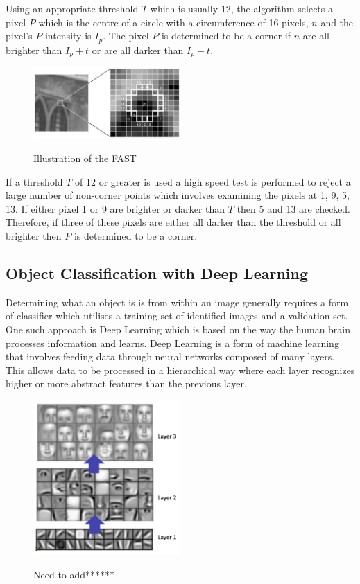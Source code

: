 \documentclass{mproj}
\begin{document}
Using an appropriate threshold $T$ which is usually 12, the algorithm selects a pixel $P$ which is the centre of a circle with a circumference of 16 pixels, $n$ and the pixel's $P$ intensity is $I_{p}$. The pixel $P$ is determined to be a corner if $n$ are all brighter than $I_{p} + t$ or are all darker than $I_{p} - t$. 

\begin{figure}[h]
  \caption{Illustration of the FAST}
  \centering
  \includegraphics[width=0.5\textwidth]{images/fast_speedtest.jpg}
  \label{fig:FAST diagram}
\end{figure}

If a threshold $T$ of 12 or greater is used a high speed test is performed to reject a large number of non-corner points which involves examining the pixels at 1, 9, 5, 13. If either pixel 1 or 9 are brighter or darker than $T$ then 5 and 13 are checked. Therefore, if three of these pixels are either all darker than the threshold or all brighter then $P$ is determined to be a corner. 

\subsection{Object Classification with Deep Learning}

Determining what an object is is from within an image generally requires a form of  classifier which utilises a training set of identified images and a validation set. One such approach is Deep Learning which is based on the way the human brain processes information and learns. Deep Learning is a form of machine learning that involves feeding data through neural networks composed of many layers. This allows data to be processed in a hierarchical way where each layer recognizes higher or more abstract features than the previous layer.

\begin{figure}[h]
  \caption{Need to add******}
  \centering
  \includegraphics[width=0.5\textwidth]{images/layers.png}
  \label{fig:Deep Net Layers diagram}
\end{figure}
\end{document}
